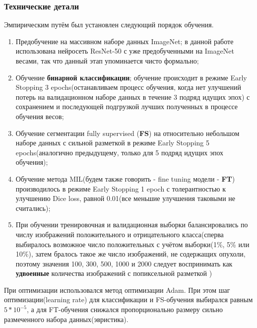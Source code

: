 \subsubsection{Технические детали}

Эмпирическим путём был установлен следующий порядок обучения.

\begin{enumerate}

	\item Предобучение на массивном наборе данных ImageNet; в данной работе использована нейросеть ResNet-50 с уже предобученными на ImageNet весами,
	так что данный этап упоминается чисто формально;

	\item Обучение {\bf бинарной классификации}; обучение происходит в режиме Early Stopping 3 epochs(останавливаем процесс обучения, когда 
	нет улучшений потерь на валидационном наборе данных в течение 3 подряд идущих эпох) с сохранением и последующей подгрузкой лучших полученных в процессе обучения весов;
	
	\item Обучение сегментации fully supervised ({\bf FS}) на относительно небольшом наборе данных с сильной разметкой в режиме Early Stopping 5 epochs(аналогично предыдущему, только для 5 подряд идущих 
	эпох обучения);
	
	\item Обучение метода MIL(будем также говорить - fine tuning модели - {\bf FT}) производилось в режиме Early Stopping 1 epoch с толерантностью к улучшению Dice loss, равной 0.01(все меньшие улучшения таковыми не считались);
	
	\item При обучении тренировочная и валидационная выборки балансировались по числу изображений положительного и отрицательного класса(сперва выбиралось возможное число положительных с учётом выборки(1\%, 5\% или 10\%), затем бралось такое же число изображений, не содержащих опухоли, поэтому значения 100, 300, 500, 1000 и 2000 следует воспринимать как {\bf удвоенные} количества изображений с попиксельной разметкой )

\end{enumerate}

При оптимизации использовался метод оптимизации Adam. При этом шаг оптимизации(learning rate) для классификации и FS-обучения выбирался равным $5*10^{-5}$, а для FT-обучения снижался пропорционально размеру сильно размеченного набора данных(эвристика).


